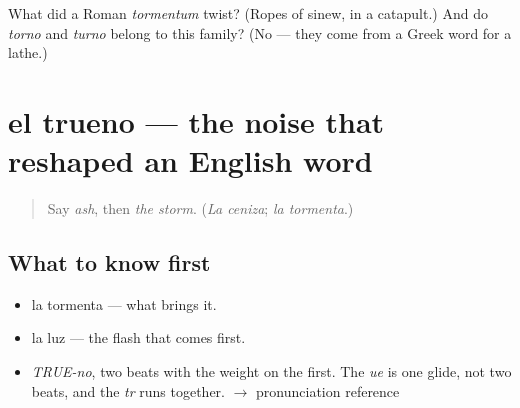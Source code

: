 \begin{tcolorbox}[breakable,colback=teal!4,colframe=teal!35!black,title={Before you move on}]
What did a Roman \emph{tormentum} twist? (Ropes of sinew, in a catapult.) And do \emph{torno} and \emph{turno} belong to this family? (No — they come from a Greek word for a lathe.)
\end{tcolorbox}
\section[el trueno]{el trueno — the noise that reshaped an English word}

\label{lesson:ES-C370-trueno}



\begin{quote}
Say \emph{ash}, then \emph{the storm}. (\emph{La ceniza}; \emph{la tormenta}.)
\end{quote}

\subsection*{What to know first}
\begin{itemize}
\raggedright
  \item la tormenta — what brings it.
  \item la luz — the flash that comes first.
\end{itemize}

\begin{sounds}
\begin{itemize}
\raggedright
  \item \emph{TRUE-no}, two beats with the weight on the first. The \emph{ue} is one glide, not two beats, and the \emph{tr} runs together. $\to$ pronunciation reference
\end{itemize}
\end{sounds}


